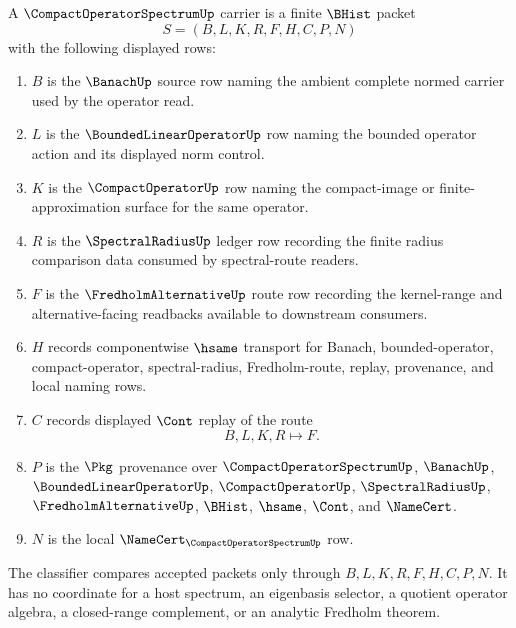 \begin{definition}
\label{def:compact-operator-spectrum-carrier}
A $\CompactOperatorSpectrumUp$ carrier is a finite $\BHist$ packet
$$
S=(B,L,K,R,F,H,C,P,N)
$$
with the following displayed rows:
\begin{enumerate}
\item $B$ is the $\BanachUp$ source row naming the ambient complete normed carrier used by the operator read.
\item $L$ is the $\BoundedLinearOperatorUp$ row naming the bounded operator action and its displayed norm control.
\item $K$ is the $\CompactOperatorUp$ row naming the compact-image or finite-approximation surface for the same operator.
\item $R$ is the $\SpectralRadiusUp$ ledger row recording the finite radius comparison data consumed by spectral-route readers.
\item $F$ is the $\FredholmAlternativeUp$ route row recording the kernel-range and alternative-facing readbacks available to downstream consumers.
\item $H$ records componentwise $\hsame$ transport for Banach, bounded-operator, compact-operator, spectral-radius, Fredholm-route, replay, provenance, and local naming rows.
\item $C$ records displayed $\Cont$ replay of the route
$$
B,L,K,R\longmapsto F .
$$
\item $P$ is the $\Pkg$ provenance over $\CompactOperatorSpectrumUp$, $\BanachUp$, $\BoundedLinearOperatorUp$, $\CompactOperatorUp$, $\SpectralRadiusUp$, $\FredholmAlternativeUp$, $\BHist$, $\hsame$, $\Cont$, and $\NameCert$.
\item $N$ is the local $\NameCert_{\CompactOperatorSpectrumUp}$ row.
\end{enumerate}
The classifier compares accepted packets only through $B,L,K,R,F,H,C,P,N$. It has no coordinate for a host spectrum, an eigenbasis selector, a quotient operator algebra, a closed-range complement, or an analytic Fredholm theorem.
\end{definition}

